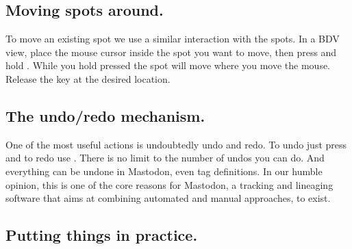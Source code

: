 \subsection{Moving spots around.}

To move an existing spot we use a similar interaction with the spots.
In a BDV view, place the mouse cursor inside the spot you want to move, then press and hold .
While you hold  pressed the spot will move where you move the mouse. 
Release the  key at the desired location.


\subsection{The undo/redo mechanism.}

One of the most useful actions is undoubtedly undo and redo. 
To undo just press  and to redo use . 
There is no limit to the number of undos you can do. 
And everything can be undone in Mastodon, even tag definitions.
In our humble opinion, this is one of the core reasons for Mastodon, a tracking and lineaging software that aims at combining automated and manual approaches, to exist.


\subsection{Putting things in practice.}


